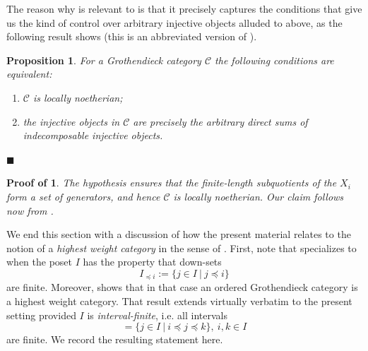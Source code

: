 \documentclass[11pt]{article}
\theoremstyle{plain}
\newtheorem{proposition}[lemma]{Proposition}
\theoremstyle{nonumberplain}
\theoremstyle{plain}
\theoremstyle{nonumberplain}
\newtheorem{proof-of-locnoe}{Proof of \Cref{pr.loc-noe}}
\newcommand\cC{\mathcal C}
\newcommand{\qedhere}{\mbox{}\hfill\ensuremath{\blacksquare}}
\begin{document}
The reason why  is relevant to  is
that it precisely captures the conditions that give us the kind of
control over arbitrary injective objects alluded to above, as the
following result shows (this is an abbreviated version of
\cite[Theorems 5.8.7, 5.8.11]{groth}).



 
\begin{proposition}\label{pr.loc-noe-aux}
For a Grothendieck category $\cC$ the following conditions are equivalent{:}
\begin{enumerate}
  \item $\cC$ is locally noetherian;
  \item {the injective objects in $\cC$} are precisely the {arbitrary}
    direct sums of indecomposable injective objects.
\end{enumerate}
\qedhere
\end{proposition}





\begin{proof-of-locnoe}
The hypothesis ensures that the finite-length subquotients of the
$X_i$ form a set of generators, and hence $\cC$ is locally noetherian. Our claim follows now from . 
\end{proof-of-locnoe}






We end this section with a discussion of how the present material
relates to the notion of a {\it highest weight category} in the sense of \cite[Definition 3.1]{CPS}. First, note that 
specializes to \cite[Definition 2.1]{us} when the poset $I$ has the
property that down-sets
\begin{equation*}
  I_{{\preceq} i}:=\{j\in I\ |\ j{\preceq} i\}
\end{equation*}
are finite. Moreover, \cite[Proposition 2.16]{us} shows that in that
case an ordered Grothendieck category is a highest weight category. That result extends virtually
verbatim to the present setting provided $I$ is {\it
  interval-finite}, i.e. all intervals
\begin{equation*}
  [i,k] = \{j\in I\ |\ i{\preceq j\preceq} k\},\ i,k\in I
\end{equation*}
are finite. We record the resulting statement here. 
\end{document}
